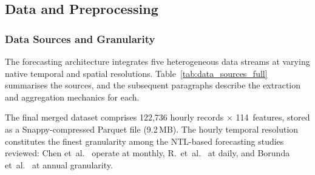 \subsection{Data and Preprocessing}
\label{subsec:data_preprocessing}

\subsubsection{Data Sources and Granularity}
\label{subsubsec:data_sources}

The forecasting architecture integrates five heterogeneous data streams at varying native temporal and spatial resolutions. Table~\ref{tab:data_sources_full} summarises the sources, and the subsequent paragraphs describe the extraction and aggregation mechanics for each.

\begin{table}[htbp]
    \centering
    \caption{Data sources integrated into the final hourly dataset. Coverage percentages refer to non-null hours in the 122{,}736-row merged dataset.}
    \label{tab:data_sources_full}
\end{table}

The final merged dataset comprises 122{,}736 hourly records $\times$ 114~features, stored as a Snappy-compressed Parquet file (9.2\,MB). The hourly temporal resolution constitutes the finest granularity among the NTL-based forecasting studies reviewed: Chen et~al.~\cite{chen_monthly_2025} operate at monthly, R.~et~al.~\cite{r_forecasting_2025} at daily, and Borunda et~al.~\cite{borunda_machine_2025} at annual granularity.

